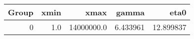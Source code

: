 \begin{tabular}{rrrrr}
\toprule
 Group &  xmin &        xmax &     gamma &       eta0 \\
\midrule
     0 &   1.0 &  14000000.0 &  6.433961 &  12.899837 \\
\bottomrule
\end{tabular}

